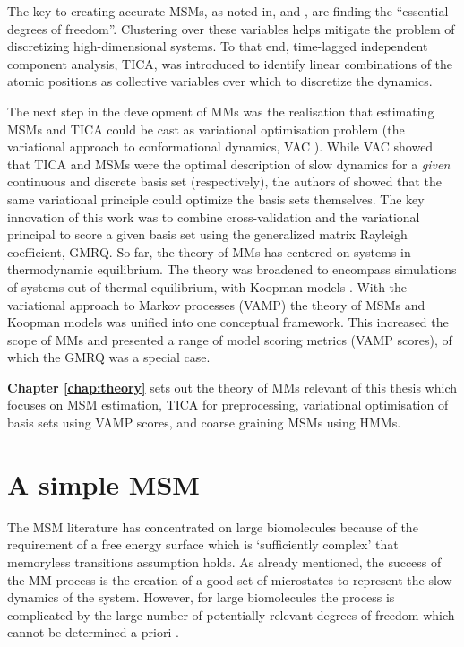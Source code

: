 The key to creating accurate MSMs, as noted in,  \cite{zwanzigClassicalDynamicsContinuous1983a} and \cite{schutteDirectApproachConformational1999}, are finding the ``essential degrees of freedom''. Clustering over these variables helps mitigate the problem of discretizing high-dimensional systems. To that end, time-lagged independent component analysis, TICA,  \cite{perez-hernandezIdentificationSlowMolecular2013a} \cite{schwantesImprovementsMarkovState2013} was introduced to identify linear combinations of the atomic positions as collective variables over which to discretize the dynamics. 

The next step in the development of MMs was the realisation that estimating MSMs and TICA could be cast as variational optimisation problem (the variational approach to conformational dynamics, VAC \cite{nuskeVariationalApproachMolecular2014}). While VAC showed that TICA and MSMs were the optimal description of slow dynamics for a \emph{given} continuous and discrete basis set (respectively), the authors of \cite{mcgibbonVariationalCrossvalidationSlow2015} showed that the same variational principle could optimize the basis sets themselves. The key innovation of this work was to combine cross-validation \cite{arlotSurveyCrossvalidationProcedures2009} and the variational principal to score a given basis set using the generalized matrix Rayleigh coefficient, GMRQ. So far, the theory of MMs has centered on systems in thermodynamic equilibrium. The theory was broadened to encompass simulations of systems out of thermal equilibrium, with Koopman models \cite{wuVariationalKoopmanModels2017}. With the variational approach to Markov processes (VAMP) the theory of MSMs and Koopman models was unified into one conceptual framework. This increased the scope of MMs and presented a range of model scoring metrics (VAMP scores), of which the GMRQ was a special case.

\textbf{Chapter \ref{chap:theory}} sets out the theory of MMs relevant of this thesis which focuses on MSM estimation, TICA for preprocessing, variational optimisation of basis sets using VAMP scores, and coarse graining MSMs using HMMs. 

\section{A simple MSM}
The MSM literature has concentrated on large biomolecules because of the requirement of a free energy surface which is `sufficiently complex' that memoryless transitions assumption holds. As already mentioned, the success of the MM process is the creation of a good set of microstates to represent the slow dynamics of the system. However, for large biomolecules the process is complicated by the large number of potentially relevant degrees of freedom which cannot be determined a-priori \cite{shallowayMacrostatesClassicalStochastic1996}. 

